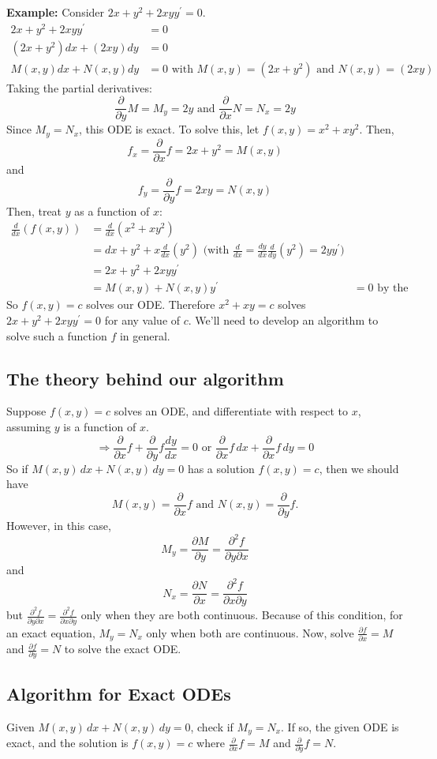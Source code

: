 \documentclass[11pt]{article}
\newcommand{\example}{\textbf{Example: }}
\newcommand{\fdx}{\frac{dy}{dx}} %
\newcommand{\yp}{y^{\prime}}
\newcommand{\fpdx}{\frac{\partial}{\partial x}} %
\newcommand{\fpdy}{\frac{\partial}{\partial y}} %
\newcommand{\dx}{\,dx} %
\newcommand{\dy}{\,dy} %
\begin{document}
	\example Consider $2x + y^2 + 2xy\yp = 0$.
		\begin{align*}
			2x + y^2 + 2xy\yp &= 0 \\
			(2x + y^2) dx + (2xy) dy &= 0 \\
			M(x,y) dx + N(x,y) dy &= 0 \text{ with } M(x,y) = (2x + y^2) \text{ and } N(x,y) = (2xy)
		\end{align*}
	Taking the partial derivatives:
		$$ \fpdy M = M_y = 2y \text{ and } \fpdx N = N_x = 2y $$
	Since $M_y = N_x$, this ODE is exact. To solve this, let $f(x,y) = x^2 + xy^2$. Then,
		$$ f_x = \fpdx f = 2x + y^2 = M(x,y) $$
	and
		$$ f_y = \fpdy f = 2xy = N(x,y) $$
	Then, treat $y$ as a function of $x$:
		\begin{align*}
			\frac{d}{dx} (f(x,y)) &= \frac{d}{dx} (x^2 + xy^2) \\
				&= dx + y^2 + x \frac{d}{dx} (y^2) \text{ (with } \frac{d}{dx} = \fdx \frac{d}{dy}(y^2) = 2 y \yp \text{)} \\
				&= 2x + y^2 + 2xy\yp \\
				&= M(x,y) + N(x,y)\yp &= 0 \text{ by the ODE.}
		\end{align*}
	So $f(x,y) = c$ solves our ODE. Therefore $x^2 + xy = c$ solves $2x + y^2 + 2xy\yp = 0$ for any value of $c$. We'll need to develop an algorithm to solve such a function $f$ in general.

\subsection{The theory behind our algorithm}
	Suppose $f(x,y) = c$ solves an ODE, and differentiate with respect to $x$, assuming $y$ is a function of $x$.
		$$ \Rightarrow \fpdx f + \fpdy f \fdx = 0 \text{ or } \fpdx f \dx + \fpdx f \,dy = 0 $$
	So if $M(x,y)\dx + N(x,y)\,dy = 0$ has a solution $f(x,y)=c$, then we should have
		$$ M(x,y) = \fpdx f \text{ and } N(x,y) = \fpdy f. $$
	However, in this case,
		$$ M_y = \frac{\partial M}{\partial y} = \frac{\partial^2 f}{\partial y \partial x} $$
	and
		$$ N_x = \frac{\partial N}{\partial x} = \frac{\partial^2 f}{\partial x \partial y} $$
	but $\frac{\partial^2 f}{\partial y \partial x} = \frac{\partial^2 f}{\partial x \partial y}$ only when they are both continuous. Because of this condition, for an exact equation, $M_y = N_x$ only when both are continuous. Now, solve $\frac{\partial f}{\partial x} = M$ and $\frac{\partial f}{\partial y} = N$ to solve the exact ODE.

\subsection{Algorithm for Exact ODEs}
	Given $M(x,y)\dx + N(x,y)\dy = 0$, check if $M_y = N_x$. If so, the given ODE is exact, and the solution is $f(x,y) = c$ where $\fpdx f = M$ and $\fpdy f = N$.
\end{document}
